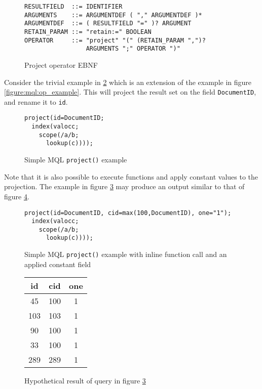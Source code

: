 \begin{figure}[!h]
\centering
\begin{Verbatim}
RESULTFIELD  ::= IDENTIFIER
ARGUMENTS    ::= ARGUMENTDEF ( "," ARGUMENTDEF )*
ARGUMENTDEF  ::= ( RESULTFIELD "=" )? ARGUMENT
RETAIN_PARAM ::= "retain:=" BOOLEAN
OPERATOR     ::= "project" "(" (RETAIN_PARAM ",")? 
                 ARGUMENTS ";" OPERATOR ")"
\end{Verbatim}
\caption{Project operator EBNF}
\label{figure:mql:ebnf:project_ebnf}
\end{figure}
Consider the trivial example in \ref{figure:mql:project_example} which is an
extension of the example in figure \ref{figure:mql:op_example}. This will
project the result set on the field \texttt{DocumentID}, and rename it to
\texttt{id}. 

\begin{figure}[!h]
\centering
\begin{Verbatim}
project(id=DocumentID;
  index(valocc; 
    scope(/a/b;
      lookup(c))));
\end{Verbatim}
\caption{Simple MQL \texttt{project()} example}
\label{figure:mql:project_example}
\end{figure}

Note that it is also possible to execute functions and apply constant values to
the projection. The example in figure \ref{figure:mql:project_example2} may
produce an output similar to that of figure
\ref{figure:mql:project_example2_result}.

\begin{figure}[!h]
\centering
\begin{Verbatim}
project(id=DocumentID, cid=max(100,DocumentID), one="1");
  index(valocc;
    scope(/a/b;
      lookup(c))));
\end{Verbatim}
\caption{Simple MQL \texttt{project()} example with inline function call 
and an applied constant field}
\label{figure:mql:project_example2}
\end{figure}

\begin{figure}[!h]
\centering
\begin{tabular}{|c | c | c |}
\hline
id & cid & one \\ \hline
45 & 100 & 1 \\ \hline
103 & 103 & 1 \\ \hline
90 & 100 & 1 \\ \hline
33 & 100 & 1 \\ \hline
289 & 289 & 1 \\ \hline
\end{tabular}
\caption{Hypothetical result of query in figure
\ref{figure:mql:project_example2}}
\label{figure:mql:project_example2_result}
\end{figure}

